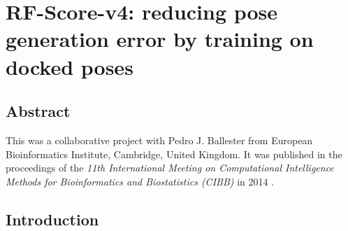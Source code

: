 \chapter{RF-Score-v4: reducing pose generation error by training on docked poses}

\section{Abstract}

This was a collaborative project with Pedro J. Ballester from European Bioinformatics Institute, Cambridge, United Kingdom. It was published in the proceedings of the \textit{11th International Meeting on Computational Intelligence Methods for Bioinformatics and Biostatistics (CIBB)} in 2014 \citep{1434}.

\section{Introduction}

\chapterend

